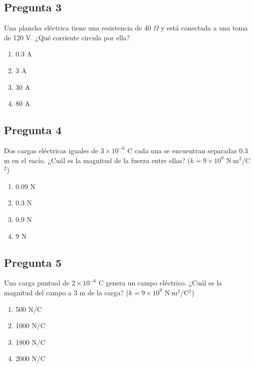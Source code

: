 \begin{preguntabox}
\subsection*{Pregunta 3}
Una plancha eléctrica tiene una resistencia de 40 $\Omega$ y está conectada a una toma de 120 V. ¿Qué corriente circula por ella?

\begin{enumerate}
    \item[A)] 0.3 A
    \item[B)] 3 A
    \item[C)] 30 A
    \item[D)] 80 A
\end{enumerate}
\end{preguntabox}

\begin{preguntabox}
\subsection*{Pregunta 4}
Dos cargas eléctricas iguales de $3 \times 10^{-6}$ C cada una se encuentran separadas 0.3 m en el vacío. ¿Cuál es la magnitud de la fuerza entre ellas? ($k = 9 \times 10^9$ N$\cdot$m$^2$/C$^2$)

\begin{enumerate}
    \item[A)] 0.09 N
    \item[B)] 0.3 N
    \item[C)] 0.9 N
    \item[D)] 9 N
\end{enumerate}
\end{preguntabox}
\newpage
\begin{preguntabox}
\subsection*{Pregunta 5}
Una carga puntual de $2 \times 10^{-6}$ C genera un campo eléctrico. ¿Cuál es la magnitud del campo a 3 m de la carga? ($k = 9 \times 10^9$ N$\cdot$m$^2$/C$^2$)

\begin{enumerate}
    \item[A)] 500 N/C
    \item[B)] 1000 N/C
    \item[C)] 1800 N/C
    \item[D)] 2000 N/C
\end{enumerate}
\end{preguntabox}

